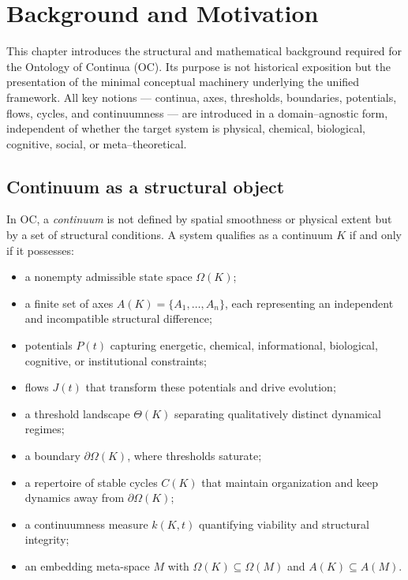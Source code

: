 
\section{Background and Motivation}
\label{sec:background}

This chapter introduces the structural and mathematical background required for the Ontology of Continua (OC).
Its purpose is not historical exposition but the presentation of the minimal conceptual machinery underlying the unified framework.
All key notions — continua, axes, thresholds, boundaries, potentials, flows, cycles, and continuumness — are introduced in a domain–agnostic form, independent of whether the target system is physical, chemical, biological, cognitive, social, or meta–theoretical.

\subsection{Continuum as a structural object}

In OC, a \emph{continuum} is not defined by spatial smoothness or physical extent but by a set of structural conditions.
A system qualifies as a continuum \(K\) if and only if it possesses:

\begin{itemize}
    \item a nonempty admissible state space \(\Omega(K)\);
    \item a finite set of axes \(A(K)=\{A_1,\dots,A_n\}\), each representing an independent and incompatible structural difference;
    \item potentials \(P(t)\) capturing energetic, chemical, informational, biological, cognitive, or institutional constraints;
    \item flows \(J(t)\) that transform these potentials and drive evolution;
    \item a threshold landscape \(\Theta(K)\) separating qualitatively distinct dynamical regimes;
    \item a boundary \(\partial\Omega(K)\), where thresholds saturate;
    \item a repertoire of stable cycles \(C(K)\) that maintain organization and keep dynamics away from \(\partial\Omega(K)\);
    \item a continuumness measure \(k(K,t)\) quantifying viability and structural integrity;
    \item an embedding meta-space \(M\) with \(\Omega(K)\subseteq\Omega(M)\) and \(A(K)\subseteq A(M)\).
\end{itemize}

